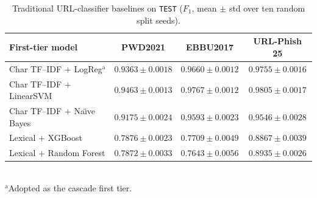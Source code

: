 \documentclass[conference,a4paper]{IEEEtran}
\begin{document}
\begin{table}[!t]
\caption{Traditional URL-classifier baselines on {\upshape\texttt{TEST}}
($F_1$, mean $\pm$ std over ten random split seeds).}
\label{tab:baselines}
\centering
\scriptsize
\setlength{\tabcolsep}{1.6pt}
\begin{tabular}{lccc}
\toprule
First-tier model & PWD2021 & EBBU2017 & URL-Phish 25 \\
\midrule
Char TF--IDF $+$ LogReg$^{\mathrm{a}}$ & $0.9363{\pm}0.0018$ & $0.9660{\pm}0.0012$ & $0.9755{\pm}0.0016$ \\
Char TF--IDF $+$ LinearSVM             & $0.9463{\pm}0.0013$ & $0.9767{\pm}0.0012$ & $0.9805{\pm}0.0017$ \\
Char TF--IDF $+$ Na\"{\i}ve Bayes      & $0.9175{\pm}0.0024$ & $0.9593{\pm}0.0023$ & $0.9546{\pm}0.0028$ \\
Lexical $+$ XGBoost                    & $0.7876{\pm}0.0023$ & $0.7709{\pm}0.0049$ & $0.8867{\pm}0.0039$ \\
Lexical $+$ Random Forest              & $0.7872{\pm}0.0033$ & $0.7643{\pm}0.0056$ & $0.8935{\pm}0.0026$ \\
\bottomrule
\end{tabular}\\[2pt]
{\scriptsize $^{\mathrm{a}}$Adopted as the cascade first tier.}
\end{table}
\end{document}
